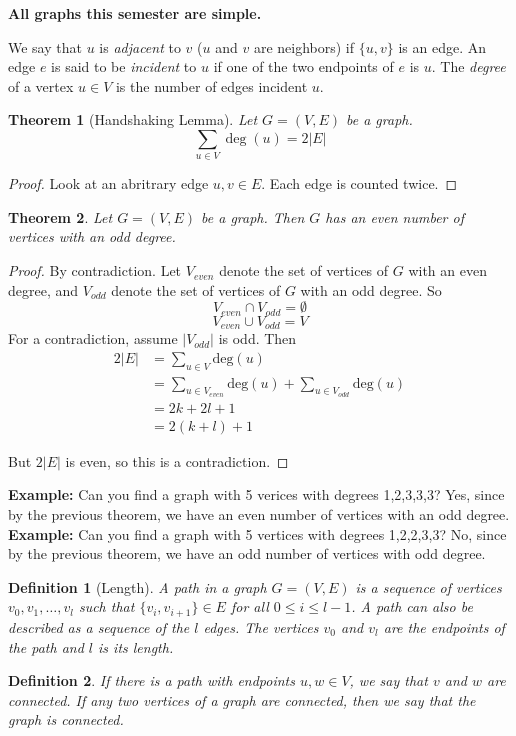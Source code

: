 \documentclass[openany]{report}
\newtheorem{theorem}{Theorem}[section]
\newtheorem{definition}{Definition}[section]
\begin{document}
\begin{center}
    \textbf{ All graphs this semester are simple.}
\end{center}
We say that $u$ is \emph{adjacent} to $v$ ($u$ and $v$ are neighbors) if $\{u,v\}$ is an edge. An edge $e$ is said to be \emph{incident} to $u$ if one of the two endpoints of $e$ is $u$. The \emph{degree} of a vertex $u \in V$ is the number of edges incident $u$.
\begin{theorem}[Handshaking Lemma]
    Let $G = (V,E)$ be a graph. 
    \[\sum_{u \in V} \deg(u) = 2|E|\]
\end{theorem} 
\begin{proof}
    Look at an abritrary edge ${u,v} \in E$. Each edge is counted twice.
\end{proof}
\begin{theorem}
    Let $G = (V,E)$ be a graph. Then $G$ has an even number of vertices with an odd degree.
\end{theorem}
\begin{proof}
    By contradiction. Let $V_{even}$ denote the set of vertices of $G$ with an even degree, and $V_{odd}$ denote the set of vertices of $G$ with an odd degree. So 
    \[V_{even} \cap V_{odd} = \emptyset\]
    \[V_{even} \cup V_{odd} = V\]
    For a contradiction, assume $|V_{odd}|$ is odd. Then
    \begin{align*}
        2|E| &= \sum_{u \in V} \text{deg}(u)\tag{Handshaking Lemma}\\
        &= \sum_{u \in V_{even}}\text{deg}(u) + \sum_{u \in V_{odd}}\text{deg}(u)\\
        &= 2k + 2l+1\\
        &= 2(k+l)+1
    \end{align*}

    But $2|E|$ is even, so this is a contradiction.
    
\end{proof}
\noindent
\textbf{Example:} Can you find a graph with 5 verices with degrees 1,2,3,3,3? Yes, since by the previous theorem, we have an even number of vertices with an odd degree. \\[3ex]
\noindent
\textbf{Example:} Can you find a graph with 5 vertices with degrees 1,2,2,3,3? No, since by the previous theorem, we have an odd number of vertices with odd degree. 
\begin{definition}[Length]
    A \emph{path} in a graph $G = (V,E)$ is a sequence of vertices $v_0, v_1, \ldots, v_l$ such that $\{v_i,v_{i+1}\} \in E$ for all $0 \leq i \leq l-1$. A path can also be described as a sequence of the $l$ edges. The vertices $v_0$ and $v_l$ are the \emph{endpoints} of the path and $l$ is its \emph{length}.
\end{definition}
\begin{definition}
    If there is a path with endpoints $u,w \in V$, we say that $v$ and $w$ are \emph{connected}. If any two vertices of a graph are connected, then we say that the graph is \emph{connected}.
\end{definition}
\end{document}
